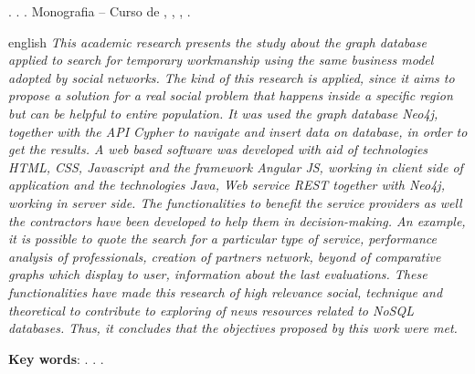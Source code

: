 
\begin{OnehalfSpacing} 

\noindent \imprimirAutorCitacaoMaiuscula. {\bfseries\imprimirtitulo}. {\imprimirdata}.  Monografia -- Curso de {\MakeUppercase\imprimircurso}, {\imprimirinstituicao}, {\imprimirlocal}, {\imprimirdata}.

\vspace{\onelineskip}
\vspace{\onelineskip}
\vspace{\onelineskip}
\vspace{\onelineskip}

\begin{resumo}[Abstract]%
\begin{otherlanguage*}{english}%
\textit{
\noindent This academic research presents the study about the graph database applied to search for temporary workmanship using the same business model adopted by social networks. The kind of this research is applied, since it aims to propose a solution for a real social problem that happens inside a specific region but can be helpful to entire population. It was used the graph database Neo4j, together with the API Cypher to navigate and insert data on database, in order to get the results. A web based software was developed with aid of technologies HTML, CSS, Javascript and the framework Angular JS, working in client side of application and the technologies Java, Web service REST together with Neo4j, working in server side. The functionalities to benefit the service providers as well the contractors have been developed to help them in decision-making. An example, it is possible to quote the search for a particular type of service, performance analysis of professionals, creation of partners network, beyond of comparative graphs which display to user, information about the last evaluations. These functionalities have made this research of high relevance social, technique and theoretical to contribute to exploring of news resources related to NoSQL databases. Thus, it concludes that the objectives proposed by this work were met.
}

\vspace{\onelineskip}
\vspace*{\fill}
\noindent \textbf{Key words}: \imprimirKeyWordOne. \imprimirKeyWordTwo. \imprimirKeyWordThree.
\end{otherlanguage*}
\vspace{\onelineskip}
\end{resumo}

\end{OnehalfSpacing}
